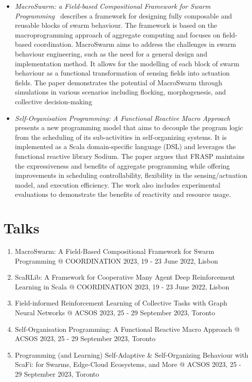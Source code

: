\documentclass[11pt]{article}
\begin{document}
\begin{itemize}
\item \textit{MacroSwarm: a Field-based Compositional Framework for Swarm Programming}~\cite{macroswarm} describes a framework for designing fully composable and reusable blocks of swarm behaviour. The framework is based on the macroprogramming approach of aggregate computing and focuses on field-based coordination. MacroSwarm aims to address the challenges in swarm behaviour engineering, such as the need for a general design and implementation method. It allows for the modelling of each block of swarm behaviour as a functional transformation of sensing fields into actuation fields. The paper demonstrates the potential of MacroSwarm through simulations in various scenarios including flocking, morphogenesis, and collective decision-making
\item \textit{Self-Organisation Programming: A Functional Reactive Macro Approach} presents a new programming model that aims to decouple the program logic from the scheduling of its sub-activities in self-organizing systems. It is implemented as a Scala domain-specific language (DSL) and leverages the functional reactive library Sodium. The paper argues that FRASP maintains the expressiveness and benefits of aggregate programming while offering improvements in scheduling controllability, flexibility in the sensing/actuation model, and execution efficiency. The work also includes experimental evaluations to demonstrate the benefits of reactivity and resource usage.
\end{itemize}

\section{Talks}
\begin{enumerate}
	\item MacroSwarm: A Field-Based Compositional Framework for Swarm Programming @ COORDINATION 2023, 19 - 23 June 2022, Lisbon
	\item ScaRLib: A Framework for Cooperative Many Agent Deep Reinforcement Learning in Scala @ COORDINATION 2023, 19 - 23 June 2022, Lisbon
	\item Field-informed Reinforcement Learning of Collective Tasks with Graph Neural Networks @ ACSOS 2023, 25 - 29 September 2023, Toronto
	\item Self-Organisation Programming: A Functional Reactive Macro Approach @ ACSOS 2023, 25 - 29 September 2023, Toronto
	\item Programming (and Learning) Self-Adaptive \& Self-Organizing Behaviour with ScaFi: for Swarms, Edge-Cloud Ecosystems, and More @ ACSOS 2023, 25 - 29 September 2023, Toronto
\end{enumerate}
\end{document}
